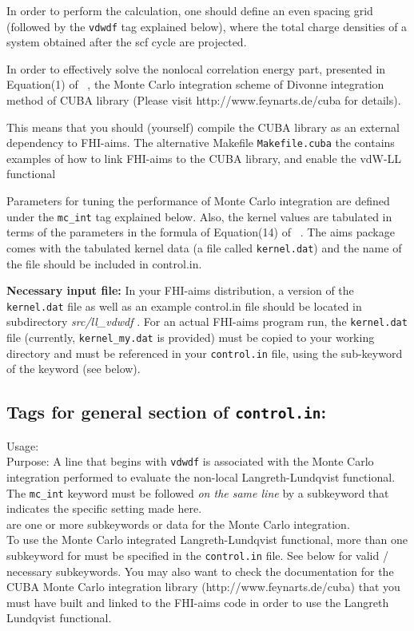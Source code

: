 In order to perform the calculation, one should define an even
spacing grid (followed by the \texttt{vdwdf} tag explained below), where
the total charge densities of a system obtained after the scf cycle
are projected.

In order to effectively solve the nonlocal correlation energy part,
presented in Equation(1) of ~\cite{Dion04}, the Monte Carlo
integration scheme of Divonne integration method of CUBA library
(Please visit http://www.feynarts.de/cuba for details). 

This means that you should (yourself) compile the CUBA library as an external
dependency to FHI-aims. The alternative Makefile \texttt{Makefile.cuba} the
contains examples of how to link FHI-aims to the CUBA library, and enable the
vdW-LL functional

Parameters
for tuning the performance of Monte Carlo integration are defined
under the \texttt{mc\_int} tag explained below. Also, the kernel values are
tabulated in terms of the parameters in the formula of Equation(14)
of ~\cite{Dion04}. The aims package comes with the tabulated kernel
data (a file called \texttt{kernel.dat}) and the name of the file should be
included in control.in.

\textbf{Necessary input file:} In your FHI-aims distribution, a version of the
\texttt{kernel.dat} file as well as an example control.in file should be located in
subdirectory \emph{src/ll\_vdwdf} . For an actual FHI-aims program run, the
\texttt{kernel.dat} file (currently, \texttt{kernel\_my.dat} is provided) must
be copied to your working directory and must be referenced in your
\texttt{control.in} file, using the 
sub-keyword of the  keyword (see below).

\newpage

\newpage

\subsection*{Tags for general section of \texttt{control.in}:}

{
  \noindent
  Usage:   \\[1.0ex]
  Purpose: A line that begins with \texttt{vdwdf} is associated with the Monte
  Carlo integration performed to evaluate the non-local Langreth-Lundqvist
  functional. The \texttt{mc\_int} keyword must be followed \emph{on the same
  line} by a subkeyword that indicates the specific setting made here. \\[1.0ex]  
   are one or more subkeywords or data for the
  Monte Carlo integration. \\
}
To use the Monte Carlo integrated Langreth-Lundqvist functional, more than one
  subkeyword for  must be specified in the
  \texttt{control.in} file. See below for valid / necessary subkeywords. You
  may also want to check the documentation for the CUBA Monte Carlo
  integration library (http://www.feynarts.de/cuba) that you must have built
  and linked to the FHI-aims code in order to use the Langreth Lundqvist
  functional. 


